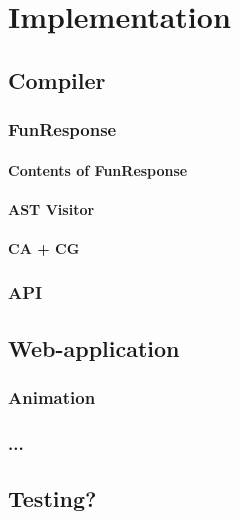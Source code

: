 \documentclass{l4proj}
\begin{document}
\chapter{Implementation}
\section{Compiler}
\subsection{FunResponse}
\subsubsection{Contents of FunResponse}
\subsubsection{AST Visitor}
\subsubsection{CA + CG}
\subsection{API}
\section{Web-application}
\subsection{Animation}
\subsection{...}
\section{Testing?}

\end{document}
